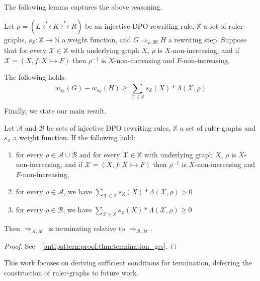 The following lemma captures the above reasoning.
\begin{lemma}
    \label{antipattern:lem:w_g_geq_w_h_leq}
    Let $\rho = (L \overset{l}{\leftarrowtail} K \overset{r}{\rightarrowtail} R)$ be an injective DPO rewriting rule,
    \( \mathbb{X} \) a set of ruler-graphs,
    \( s_{\mathbb{X}} \colon \mathbb{X} \to \mathbb{N} \) a weight function,
    and \( G \Rightarrow_{\rho,\mathfrak{M}} H \) a rewriting step. 
    Suppose that for every \( \mathcal{X} \in \mathbb{X} \) with underlying graph $X$, 
    $\rho$ is $X$-non-increasing, and if $\mathcal{X}= (X,f:X \rightarrowtail F)$ then $\rho^{-1}$ is $X$-non-increasing and $F$-non-increasing.
     
    The following holds:
     $$
        w_{s_\mathbb{X}}(G) - w_{s_\mathbb{X}}(H) 
        \geq 
        \sum_{\mathcal{X} \in \mathbb{X}}^{}s_\mathbb{X}(X) * \Lambda(\mathcal{X},\rho)
    $$
\end{lemma}
Finally, we state our main result.
\begin{theorem}[Termination] 
    \label{antipattern:thm:termination_grs} 
    Let \(\mathcal{A}\) and \(\mathcal{B}\) be sets of injective DPO rewriting rules, $\mathbb{X}$ a set of ruler-graphs and $s_\mathbb{X}$ a weight function. If the following hold:
    \begin{enumerate}
        \item  for every $\rho \in \mathcal{A} \cup \mathcal{B}$ and for every \( \mathcal{X} \in \mathbb{X} \) with underlying graph $X$, 
        $\rho$ is $X$-non-increasing, and if $\mathcal{X}= (X,f:X \rightarrowtail F)$ then $\rho^{-1}$ is $X$-non-increasing and $F$-non-increasing,
        \item for every \(\rho \in \mathcal{A}\), we have
        $ \sum_{\mathcal{X} \in \mathbb{X}}^{}s_\mathbb{X}(X) * 
            \Lambda(\mathcal{X},\rho) > 0 $
        \item for every \(\rho \in \mathcal{B}\), we have   
        $ 
            \sum_{\mathcal{X} \in \mathbb{X}}^{}s_\mathbb{X}(X) * \Lambda(\mathcal{X},\rho) \geq 0 
        $
    \end{enumerate}
    Then \(\Rightarrow_{\mathcal{A},\mathcal{M}}\) is terminating relative to \(\Rightarrow_{\mathcal{B},\mathcal{M}}\).
\end{theorem}
\begin{proof}
    See~\textsection~\ref{antipattern:proof:thm:termination_grs}.
\end{proof}
\begin{remark}
    This work focuses on deriving sufficient conditions for termination, deferring the construction of ruler-graphs to future work.
\end{remark} 